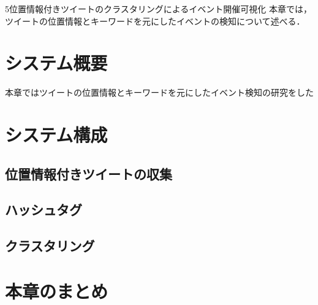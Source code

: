 \chapterhead
{5}{位置情報付きツイートのクラスタリングによるイベント開催可視化}
{本章では，ツイートの位置情報とキーワードを元にしたイベントの検知について述べる．}


\section{システム概要}
本章ではツイートの位置情報とキーワードを元にしたイベント検知の研究をした

\section{システム構成}
\subsection{位置情報付きツイートの収集}
\subsection{ハッシュタグ}
\subsection{クラスタリング}

\newpage

\section{本章のまとめ}

\newpage
